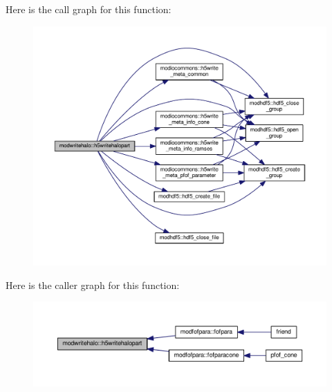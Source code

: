 Here is the call graph for this function\+:\nopagebreak
\begin{figure}[H]
\begin{center}
\leavevmode
\includegraphics[width=350pt]{namespacemodwritehalo_a3e00317bab6230ca8987e14b62b79874_cgraph}
\end{center}
\end{figure}




Here is the caller graph for this function\+:\nopagebreak
\begin{figure}[H]
\begin{center}
\leavevmode
\includegraphics[width=350pt]{namespacemodwritehalo_a3e00317bab6230ca8987e14b62b79874_icgraph}
\end{center}
\end{figure}



